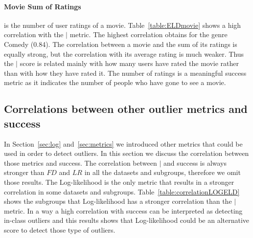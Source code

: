 {	\paragraph{Movie Sum of Ratings} is the number of user ratings of a movie. Table~\ref{table:ELDmovie} shows a high correlation with the $\mid$ metric. The highest correlation obtains for the genre Comedy (0.84). 
	The correlation between a movie and the sum of its ratings is equally strong, but the correlation with its average rating is much weaker. Thus the $\mid$ score is related mainly with how many users have rated the movie rather than with how they have rated it. The number of ratings is a meaningful success metric as it indicates the number of people who have gone to see a movie.  
	





\subsection{Correlations between other outlier metrics and success} \label{sec:corr-others}
In Section~\ref{sec:log} and~\ref{sec:metrics} we introduced other metrics that could be used in order to detect outliers. In this section we discuss the correlation between those metrics and success. The correlation between $\mid$ and success is always stronger than $\textit{FD}$ and $\textit{LR}$ in all the datasets and subgroups, therefore we omit those results. The Log-likelihood is the only metric that results in a stronger correlation in some datasets and subgroups. Table~\ref{table:correlationLOGELD} shows the subgroups that Log-likelihood has a stronger correlation than the $\mid$ metric. 
In a way a high correlation with success can be interpreted as detecting in-class outliers and this results shows that Log-likelihood could be an alternative score to detect those type of outliers.
		\begin{table}


\end{table}}
